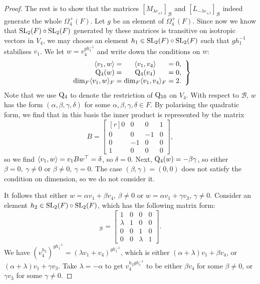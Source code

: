 \begin{proof}
	The rest is to show that the matrices $[M_{\lambda e_{\pm 1}}]_{\mathcal{B}}$ and $[L_{- \lambda  
	e_{\pm 1}}]_{\mathcal{B}}$ indeed generate 
	the whole $\Omega_{4}^+(F)$. Let $g$ be an element of $\Omega_4^+(F)$. Since now we know that 
\mbox{$\mathrm{SL}_2(F) \circ \mathrm{SL}_2(F)$} generated by
	these matrices is transitive on isotropic vectors in $V_4$, we may choose an element $h_1 \in \mathrm{SL}_2(F) \circ \mathrm{SL}_2(F)$ such that 
	$g h_1^{-1}$ stabilises $v_1$. We let $w = v_4^{g h_1^{-1}}$ and write down the conditions on $w$:
	\begin{equation*}
		\left.
		\begin{array}{r@{\;}c@{\;}c@{\;}c@{\;}l}
			\inner{v_1}{w} & = & \inner{v_1}{v_4} & = & 0, \\
			\QQ_4(w) & = & \QQ_4(v_4) & = & 0, \\
			\dim_F \inner{v_1}{w}_F & = & \dim_F \inner{v_1}{v_4}_F & = & 2.
		\end{array}
		\right\}
	\end{equation*}
	Note that we use $\mathord{\mathrm{Q}}_4$ to 
	denote the restriction of $\mathord{\mathrm{Q}}_{10}$ on $V_4$. With respect to $\mathcal{B}$, $w$ has the 
	form $(\alpha, \beta, \gamma, \delta)$ for some $\alpha,\beta,\gamma,\delta \in F$.
	By polarising the quadratic form, we find that in this basis the inner product is 
	represented by the matrix
	\begin{equation*}
		B = \begin{bmatrix}[r]
			0 & 0 & 0 & 1 \\
			0 & 0 & -1 & 0 \\
			0 & -1 & 0 & 0 \\
			1 & 0 & 0 & 0
		\end{bmatrix},
	\end{equation*}
	so we find $\langle v_1, w \rangle = v_1 B w^{\top} = \delta$, so $\delta = 0$. Next, 
	\mbox{$\mathord{\mathrm{Q}}_4(w) = -\beta \gamma$}, so either $\beta = 0,\ \gamma \neq 0$ or $\beta \neq 0,\ \gamma = 0$. The 
	case $(\beta, \gamma) = (0,0)$ does not satisfy the condition on dimension, so we do not consider it. 
	
	It follows that either $w = \alpha v_1 + \beta v_4$, $\beta \neq 0$ or $w = \alpha v_1 + \gamma v_3$, $\gamma \neq 0$. 
	Consider an element $h_2 \in \mathrm{SL}_2(F) \circ \mathrm{SL}_2(F)$, which has the following matrix form:
	\begin{equation*}
		[h_2]_{\mathcal{B}} = 
		\begin{bmatrix}
			1 & 0 & 0 & 0 \\
			\lambda & 1 & 0 & 0 \\
			0 & 0 & 1 & 0 \\
			0 & 0 & \lambda & 1
		\end{bmatrix}.
	\end{equation*}
	We have $(v_4^{h_2})^{g h_1^{-1}} = (\lambda v_1 + v_4)^{g h_1^{-1}}$, which is either $(\alpha + \lambda) v_1 + \beta v_4$, or 
	$(\alpha + \lambda) v_1 + \gamma v_3$. Take $\lambda = -\alpha$ to get $v_4^{h_2 g h_1^{-1}}$ to be either 
	$\beta v_4$ for some $\beta \neq 0$, or $\gamma v_3$ for some $\gamma \neq 0$. 
	

\end{proof}
